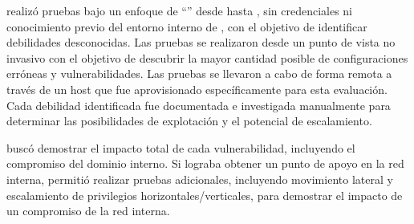 \qquad\brandName realizó pruebas bajo un enfoque de “\typePentest” desde \initialDate hasta \finalDate, sin credenciales ni conocimiento previo del entorno interno de \enterpriseName, con el objetivo de identificar debilidades desconocidas. Las pruebas se realizaron desde un punto de vista no invasivo con el objetivo de descubrir la mayor cantidad posible de configuraciones erróneas y vulnerabilidades. Las pruebas se llevaron a cabo de forma remota a través de un host que fue aprovisionado específicamente para esta evaluación. Cada debilidad identificada fue documentada e investigada manualmente para determinar las posibilidades de explotación y el potencial de escalamiento. 

\brandName buscó demostrar el impacto total de cada vulnerabilidad, incluyendo el compromiso del dominio interno. Si \brandName lograba obtener un punto de apoyo en la red interna, \enterpriseName permitió realizar pruebas adicionales, incluyendo movimiento lateral y escalamiento de privilegios horizontales/verticales, para demostrar el impacto de un compromiso de la red interna.
